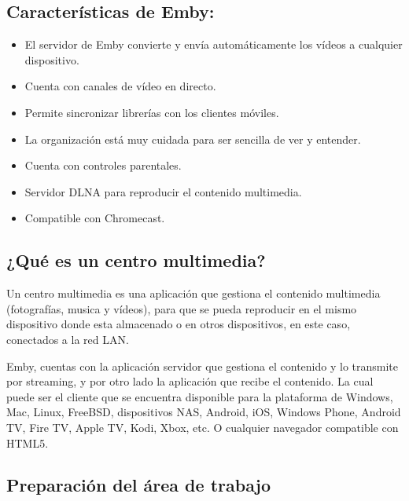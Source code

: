 		\subsection{Características de Emby:}
			
			\begin{itemize}
				
				\item El servidor de Emby convierte y envía automáticamente los vídeos a cualquier dispositivo.
				
				\item Cuenta con canales de vídeo en directo.
				
				\item Permite sincronizar librerías con los clientes móviles.
				
				\item La organización está muy cuidada para ser sencilla de ver y entender.
				
				\item Cuenta con controles parentales.
				
				\item Servidor DLNA para reproducir el contenido multimedia.
				
				\item Compatible con Chromecast.
	
			\end{itemize}
		
		\subsection{¿Qué es un centro multimedia?}
		
			Un centro multimedia es una aplicación que gestiona el contenido multimedia (fotografías, musica y vídeos), para que se pueda reproducir en el mismo dispositivo donde esta almacenado o en otros dispositivos, en este caso, conectados a la red LAN.
		
			Emby, cuentas con la aplicación servidor que gestiona el contenido y lo transmite por streaming, y por otro lado la aplicación que recibe el contenido. La cual puede ser el cliente que se encuentra disponible para la plataforma de Windows, Mac, Linux, FreeBSD, dispositivos NAS, Android, iOS, Windows Phone, Android TV, Fire TV, Apple TV, Kodi, Xbox, etc. O  cualquier navegador compatible con HTML5.
		
		\subsection{Preparación del área de trabajo}
			
